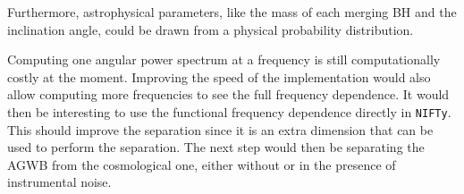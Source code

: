 Furthermore, astrophysical parameters, like the mass of each merging BH and the inclination angle, could be drawn from a physical probability distribution.

Computing one angular power spectrum at a frequency is still computationally costly at the moment. Improving the speed of the implementation would also allow computing more frequencies to see the full frequency dependence. It would then be interesting to use the functional frequency dependence directly in {\tt NIFTy}. This should improve the separation since it is an extra dimension that can be used to perform the separation. 
The next step would then be separating the AGWB from the cosmological one, either without or in the presence of instrumental noise.